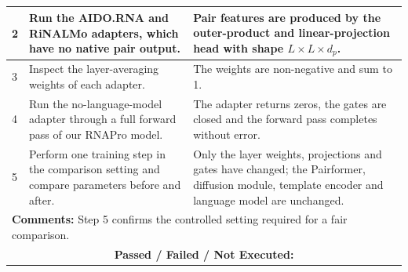 \documentclass{FastFyp}
\begin{document}
{\begin{longtable}{|p{2.4cm}|p{4.6cm}|p{2.4cm}|p{3.8cm}|}
2 & Run the AIDO.RNA and RiNALMo adapters, which have no native pair output. & \multicolumn{2}{p{6.64cm}|}{Pair features are produced by the outer-product and linear-projection head with shape $L \times L \times d_p$.} \\ \hline
3 & Inspect the layer-averaging weights of each adapter. & \multicolumn{2}{p{6.64cm}|}{The weights are non-negative and sum to 1.} \\ \hline
4 & Run the no-language-model adapter through a full forward pass of our RNAPro model. & \multicolumn{2}{p{6.64cm}|}{The adapter returns zeros, the gates are closed and the forward pass completes without error.} \\ \hline
5 & Perform one training step in the comparison setting and compare parameters before and after. & \multicolumn{2}{p{6.64cm}|}{Only the layer weights, projections and gates have changed; the Pairformer, diffusion module, template encoder and language model are unchanged.} \\ \hline
\multicolumn{4}{|p{14.51cm}|}{\textbf{Comments:} Step 5 confirms the controlled setting required for a fair comparison.} \\ \hline
\multicolumn{4}{|c|}{\textbf{Passed / Failed / Not Executed:}} \\ \hline
\end{longtable}
}
\end{document}
